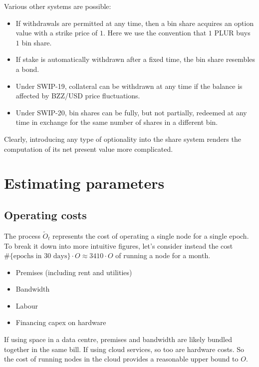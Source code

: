 Various other systems are possible:
%
\begin{itemize}
  \item 
    If withdrawals are permitted at any time, then a bin share acquires an option value with a strike price of $1$.
    Here we use the convention that $1$ PLUR buys $1$ bin share.

  \item
    If stake is automatically withdrawn after a fixed time, the bin share resembles a bond.

  \item
    Under SWIP-19, collateral can be withdrawn at any time if the balance is affected by BZZ/USD  price fluctuations.
    
  \item
    Under SWIP-20, bin shares can be fully, but not partially, redeemed at any time in exchange for the same number of shares in a different bin.
\end{itemize}
%
Clearly, introducing any type of optionality into the share system renders the computation of its net present value more complicated.

\newpage
\section{Estimating parameters}

\subsection{Operating costs}

The process $\tilde{O}_t$ represents the cost of operating a single node for a single epoch.
%
To break it down into more intuitive figures, let's consider instead the cost $\#\{\text{epochs in 30 days}\}\cdot O\approx 3410\cdot O$ of running a node for a month.

\begin{itemize}
  \item Premises (including rent and utilities)
  \item Bandwidth
  \item Labour
  \item Financing capex on hardware
\end{itemize}
If using space in a data centre, premises and bandwidth are likely bundled together in the same bill.
%
If using cloud services, so too are hardware costs.
%
So the cost of running nodes in the cloud provides a reasonable upper bound to $O$.
